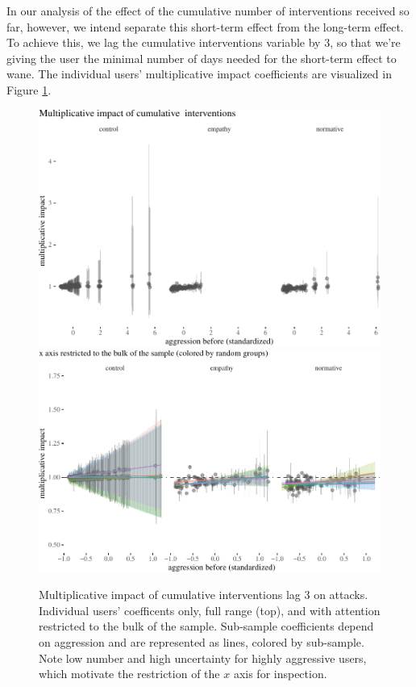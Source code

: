 \documentclass[preprint,12pt]{elsarticle}
\begin{document}
In our analysis of the effect of the cumulative number of interventions
received so far, however, we intend separate this short-term effect from
the long-term effect. To achieve this, we lag the cumulative
interventions variable by 3, so that we're giving the user the minimal
number of days needed for the short-term effect to wane. The individual
users' multiplicative impact coefficients are visualized in Figure
\ref{fig:cumulativeResultsPlot}.


\begin{figure}

\begin{center}\includegraphics[width=.8\linewidth]{ figures/fig:cumulativeResultsPlot-1} \includegraphics[width=.8\linewidth]{ figures/fig:cumulativeResultsPlot-2} \end{center}
\caption{Multiplicative impact of cumulative interventions lag 3 on attacks. Individual users' coefficents only, full range (top), and with attention restricted to the bulk of the sample. Sub-sample coefficients depend on aggression and are represented as lines, colored by sub-sample. Note low number and high uncertainty for highly aggressive users, which motivate the restriction of the $x$ axis for inspection.}
\label{fig:cumulativeResultsPlot}
\end{figure}
\end{document}
